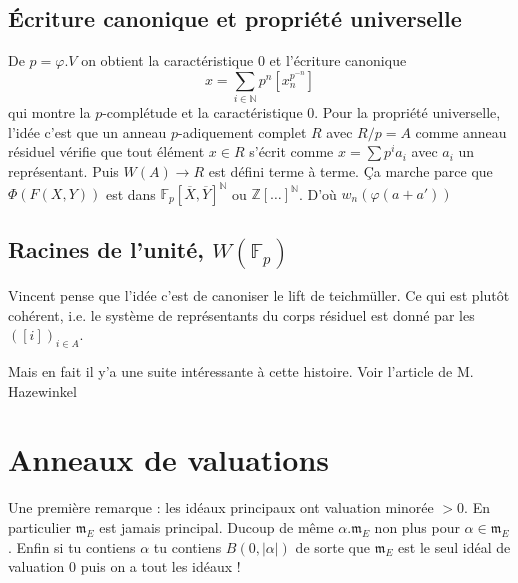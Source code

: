 \documentclass[a4paper,12pt]{article}
\newcommand{\Z}{\mathbb{Z}}
\newcommand{\N}{\mathbb{N}}
\newcommand{\F}{\mathbb F}
\newcommand{\m}{\mathfrak m}
\theoremstyle{plain}
\theoremstyle{definition}
\theoremstyle{remark}
\begin{document}
\subsection{Écriture canonique et propriété universelle}
De $p=\varphi.V$ on obtient la caractéristique $0$ et l'écriture
canonique
\[x=\sum_{i\in \N}p^n[x_n^{p^{-n}}]\]
qui montre la $p$-complétude et la caractéristique $0$. Pour
la propriété universelle, l'idée c'est que un anneau $p$-adiquement
complet $R$ avec $R/p=A$ comme anneau résiduel vérifie que tout 
élément $x\in R$ s'écrit comme $ x=\sum p^ia_i$ avec $a_i$ un
représentant. Puis $W(A)\to R$ est défini terme à terme. Ça
marche parce que $\Phi(F(X,Y))$ est dans $\F_p[\overline X,\overline Y]^\N$
ou $\Z[\ldots]^\N$. D'où $w_n(\varphi(a+a'))$



\subsection{Racines de l'unité, $W(\F_p)$}
Vincent pense que l'idée c'est de canoniser le lift de teichmüller.
Ce qui est plutôt cohérent, i.e. le système de représentants du
corps résiduel est donné par les $([i])_{i\in A}$.

Mais en fait il y'a une suite intéressante à cette histoire. 
Voir l'article de M. Hazewinkel

\section{Anneaux de valuations}
Une première remarque : les idéaux principaux ont valuation
minorée $>0$. En particulier $\m_E$ est jamais principal. Ducoup
de même $\alpha.\m_E$ non plus pour $\alpha\in \m_E$. Enfin si
tu contiens $\alpha$ tu contiens $B(0, |\alpha|)$ de sorte que
$\m_E$ est le seul idéal de valuation $0$ puis on a tout les
idéaux !
\end{document}
